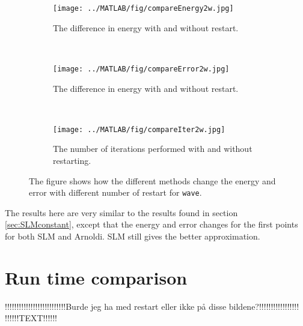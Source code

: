 \begin{figure}[H]
        \centering
        \begin{subfigure}[b]{0.3\textwidth}
                \texttt{[image: ../MATLAB/fig/compareEnergy2w.jpg]}
                \caption{ The difference in energy with and without restart. }
                \label{fig:compareEnergy2w}
        \end{subfigure}
        ~
        \begin{subfigure}[b]{0.3\textwidth}
                \texttt{[image: ../MATLAB/fig/compareError2w.jpg]}
                \caption{ The difference in energy with and without restart. }
                \label{fig:compareError2w}
        \end{subfigure}
        ~
        \begin{subfigure}[b]{0.3\textwidth}
                \texttt{[image: ../MATLAB/fig/compareIter2w.jpg]}
                \caption{ The number of iterations performed with and without restarting.  }
                \label{fig:compareIter2w}
        \end{subfigure}
        \caption{ The figure shows how the different methods change the energy and error with different number of restart for \texttt{wave}.  }
        \label{fig:compare2w}
\end{figure}
The results here are very similar to the results found in section \ref{sec:SLMconstant}, except that the energy and error changes for the first points for both SLM and Arnoldi. SLM still gives the better approximation.

\section{Run time comparison}%
!!!!!!!!!!!!!!!!!!!!!!!!!!Burde jeg ha med restart eller ikke på disse bildene?!!!!!!!!!!!!!!!!!\\
!!!!!!TEXT!!!!!! \\

